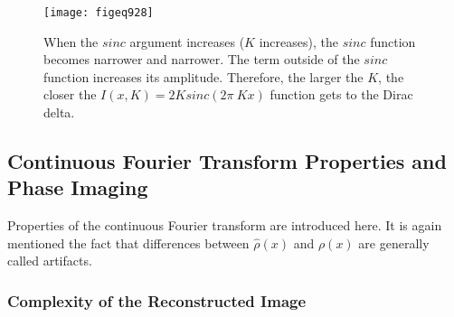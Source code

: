 \begin{figure}[H]
    \centering
    \texttt{[image: figeq928]}
    \caption{When the $sinc$ argument increases ($K$ increases), the $sinc$ function becomes narrower and narrower. The term outside of the $sinc$ function increases its amplitude. Therefore, the larger the $K$, the closer the $I(x,K) = 2K sinc(2\pi \ K x)$ function gets to the Dirac delta.}
    \label{fig:figeq928}
\end{figure}




\clearpage
\subsection{Continuous Fourier Transform Properties and Phase Imaging}
Properties of the continuous Fourier transform are introduced here. It is again mentioned the fact that differences between $\hat{\rho}(x)$ and $\rho(x)$ are generally called artifacts.

%
\subsubsection{Complexity of the Reconstructed Image}

